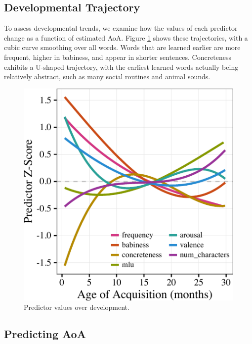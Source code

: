 \documentclass[10pt, letterpaper]{article}
\newenvironment{CodeChunk}{}{}
\begin{document}
\subsection{Developmental Trajectory}\label{developmental-trajectory}

To assess developmental trends, we examine how the values of each
predictor change as a function of estimated AoA. Figure \ref{fig:devo}
shows these trajectories, with a cubic curve smoothing over all words.
Words that are learned earlier are more frequent, higher in babiness,
and appear in shorter sentences. Concreteness exhibits a U-shaped
trajectory, with the earliest learned words actually being relatively
abstract, such as many social routines and animal sounds.

\begin{CodeChunk}
\begin{figure}[tb]

{\centering \includegraphics{figs/devo-1} 

}

\caption[Predictor values over development]{Predictor values over development.}\label{fig:devo}
\end{figure}
\end{CodeChunk}

\subsection{Predicting AoA}\label{predicting-aoa}
\end{document}

